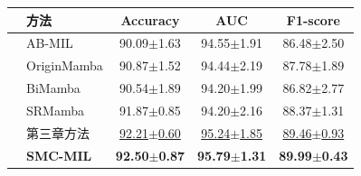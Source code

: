 \begin{table}[h!]
  \large    %
  \centering
  \begin{tabularx}{\textwidth}{clCCC}
    \toprule
    &方法  & Accuracy& AUC&F1-score\\ \midrule
    &AB-MIL  & 90.09$\pm$1.63 & {94.55$\pm$1.91} & 86.48$\pm$2.50\\
    &OriginMamba        & 90.87$\pm$1.52 & 94.44$\pm$2.19 & 87.78$\pm$1.89\\
    &BiMamba          & 90.54$\pm$1.89 & 94.20$\pm$1.99 & 86.82$\pm$2.77\\
    &SRMamba & {91.87$\pm$0.85} & 94.20$\pm$2.16 & {88.37$\pm$1.31}\\
    &%
    第三章方法 & \underline{92.21$\pm$0.60} & \underline{95.24$\pm$1.85} & \underline{89.46$\pm$0.93}\\  
    &\textbf{SMC-MIL}        & \textbf{92.50$\pm$0.87} & \textbf{95.79$\pm$1.31} & \textbf{89.99$\pm$0.43}\\  
    \bottomrule
  \end{tabularx}
 \vspace{-25pt}
  \label{table4: CAMELYON_PLIP}
\end{table}
